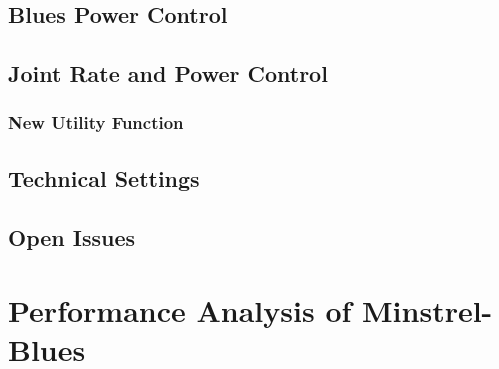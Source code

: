 \documentclass{sig-alternate}
\begin{document}
		\subsection{Blues Power Control}
		\label{s:minstrel-blues}

		\subsection{Joint Rate and Power Control}
		\label{s:joint-control}

			\subsubsection{New Utility Function}
			\label{s:utility-function}

		\subsection{Technical Settings}
		\label{s:technical-settings}

		\subsection{Open Issues}
		\label{s:open-issues}






	\section{Performance Analysis of Minstrel-Blues}
	\label{s:performance-analysis}

\end{document}
